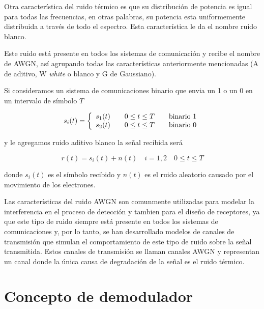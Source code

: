 Otra caracter\'istica del ruido t\'ermico es que su distribuci\'on de potencia es igual para
todas las frecuencias, en otras palabras, su potencia esta uniformemente distribuida a trav\'es de
todo el espectro. Esta caracter\'istica le da el nombre ruido blanco.

Este ruido est\'a presente en todos los sistemas de comunicaci\'on y recibe el nombre de AWGN, as\'i
agrupando todas las caracter\'isticas anteriormente mencionadas (A de aditivo, W \emph{white} o
blanco y G de Gaussiano).

Si consideramos un sistema de comunicaciones binario que envia un 1 o un 0 en un intervalo de
s\'imbolo $T$

\begin{equation}\label{eq:binarycom}
s_i(t)=\left\{
\begin{array}{l l l}
s_1(t) & \quad 0\leq t \leq T & \quad \mbox{binario 1}\\
s_2(t) & \quad 0\leq t \leq T & \quad \mbox{binario 0}\\
\end{array}\right.
\end{equation}

y le agregamos ruido aditivo blanco la se\~nal recibida ser\'a

\begin{equation}\label{eq:signoise}
r(t)=s_i(t)+n(t) \quad i=1,2 \quad 0\leq t \leq T
\end{equation}

donde $s_i(t)$ es el s\'imbolo recibido y $n(t)$ es el ruido aleatorio causado por el movimiento de
los electrones.

Las caracter\'isticas del ruido AWGN son comunmente utilizadas para modelar la interferencia en
el proceso de detecci\'on y tambien para el dise\~no de receptores, ya que este tipo de ruido
siempre est\'a presente en todos los sistemas de comunicaciones y, por lo tanto, se han desarrollado
modelos de canales de transmisi\'on que simulan el comportamiento de este tipo de ruido sobre la
se\~nal transmitida. Estos canales de transmisi\'on se llaman canales AWGN y representan un canal
donde la \'unica causa de degradaci\'on de la se\~nal es el ruido t\'ermico.

\section{Concepto de demodulador}

